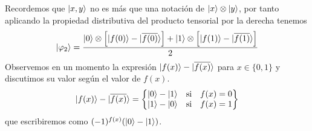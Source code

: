 \documentclass[a4paper]{article}
\numberwithin{equation}{section}
\begin{document}
Recordemos que $\ket{x,y}$ no es más que una notación de $\ket{x}\otimes\ket{y}$, por tanto aplicando la propiedad distributiva del producto tensorial por la derecha tenemos
\begin{equation} \label{eq45}
\ket{\varphi_2} =
\frac{\ket{0} \otimes \left[ \ket{f(0)} - \ket{\overline{f(0)}} \right] + \ket{1} \otimes \left[ \ket{f(1)} - \ket{\overline{f(1)}} \right]}{2}
\end{equation}
Observemos en un momento la expresión $\ket{f(x)} -\ket{\overline{f(x)}}$ para $x \in \lbrace 0,1 \rbrace$ y discutimos su valor según el valor de $f(x)$.
\begin{equation}
\ket{f(x)} - \ket{\overline{f(x)}} =
\begin{Bmatrix}
\ket{0} - \ket{1} & \textrm{si} & f(x) = 0 \\
\ket{1} - \ket{0} & \textrm{si} & f(x) = 1
\end{Bmatrix}
\end{equation}
que escribiremos como $(-1)^{f(x)}(\ket{0} - \ket{1})$.
\end{document}
